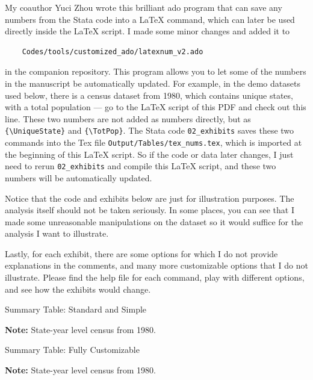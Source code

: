 My coauthor Yuci Zhou wrote this brilliant ado program that can save any numbers from the Stata code into a {\LaTeX} command, which can later be used directly inside the {\LaTeX} script. I made some minor changes and added it to 
\begin{verbatim}
    Codes/tools/customized_ado/latexnum_v2.ado
\end{verbatim}
in the companion repository. This program allows you to let some of the numbers in the manuscript be automatically updated. For example, in the demo datasets used below, there is a census dataset from 1980, which contains {\UniqueState} unique states, with a total population {\TotPop} --- go to the {\LaTeX} script of this PDF and check out this line. These two numbers are not added as numbers directly, but as \verb|{\UniqueState}| and \verb|{\TotPop}|. The Stata code \verb|02_exhibits| saves these two commands into the Tex file \verb|Output/Tables/tex_nums.tex|, which is imported at the beginning of this {\LaTeX} script. So if the code or data later changes, I just need to rerun \verb|02_exhibits| and compile this {\LaTeX} script, and these two numbers will be automatically updated. 

Notice that the code and exhibits below are just for illustration purposes. The analysis itself should not be taken seriously. In some places, you can see that I made some unreasonable manipulations on the dataset so it would suffice for the analysis I want to illustrate. 

Lastly, for each exhibit, there are some options for which I do not provide explanations in the comments, and many more customizable options that I do not illustrate. Please find the help file for each command, play with different options, and see how the exhibits would change. 

\begin{table}[H]
    \caption{Summary Table: Standard and Simple}
    \centering
    \resizebox{0.9\textwidth}{!}{ %
    
    }
    \caption*{\scriptsize\textbf{Note:} State-year level census from 1980.}
\end{table}

\begin{table}[H]
    \caption{Summary Table: Fully Customizable}
    \centering
    \resizebox{0.9\textwidth}{!}{ %
    
    }
    \caption*{\scriptsize\textbf{Note:} State-year level census from 1980.}
\end{table}

